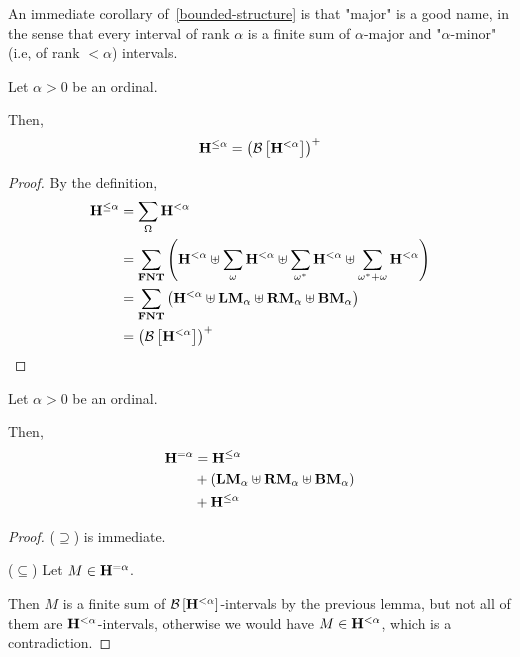 An immediate corollary of~\cref{bounded-structure} is that "major" is a good name, in the sense that every interval of rank $\alpha$ is a finite sum
of $\alpha$-major and "$\alpha$-minor" (i.e, of rank $< \alpha$) intervals.

\begin{corollary}\label{le-alpha-corollary}
  Let $\alpha > 0$ be an ordinal.

  Then,
  \[
    \mathbf{H}^{\le \alpha} = \left( {\mathcal{B} \left[ {\mathbf{H}^{< \alpha}} \right]} \right)^+
  \]
\end{corollary}

\begin{proof}
  By the definition,
  \begin{align*}
    \mathbf{H}^{\le \alpha} & = \sum_{\Omega}{\mathbf{H}^{< \alpha}}                                                                                                            \\
                    & = \sum_{\mathbf{FNT}} \left( { {\mathbf{H}^{< \alpha}} \uplus \sum_{\omega}{\mathbf{H}^{< \alpha}} \uplus \sum_{\omega^\ast}{\mathbf{H}^{< \alpha}}  \uplus \sum_{\omega^\ast + \omega}{\mathbf{H}^{< \alpha}}
    } \right)                                                                                                                                                        \\
                    & = \sum_{\mathbf{FNT}} \left( {\mathbf{H}^{< \alpha} \uplus \mathbf{LM}_{\alpha}
    \uplus \mathbf{RM}_{\alpha} \uplus \mathbf{BM}_{\alpha}} \right)                                                                                                                 \\
                    & = \left( {\mathcal{B} \left[ {\mathbf{H}^{< \alpha}} \right]} \right)^+
  \end{align*}
\end{proof}

\begin{corollary}\label{eq-alpha-corollary}
  Let $\alpha > 0$ be an ordinal.

  Then,
  \begin{align*}
    \mathbf{H}^{= \alpha} & = \mathbf{H}^{\le \alpha}                                          \\
                  & + (\mathbf{LM}_{\alpha} \uplus \mathbf{RM}_{\alpha} \uplus \mathbf{BM}_{\alpha}) \\
                  & + \mathbf{H}^{\le \alpha}
  \end{align*}
\end{corollary}

\begin{proof}
  ($\supseteq$) is immediate.

  ($\subseteq$) Let $M \in \mathbf{H}^{= \alpha}$.

  Then $M$ is a finite sum of $\mathcal{B} \left[ {\mathbf{H}^{< \alpha}} \right]$-intervals by the previous lemma,
  but not all of them are $\mathbf{H}^{< \alpha}$-intervals,
  otherwise we would have $M \in \mathbf{H}^{< \alpha}$, which is a contradiction.
\end{proof}

